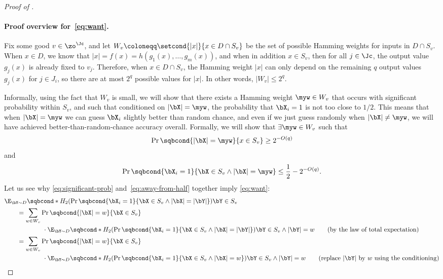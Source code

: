 \begin{proof}[Proof of ]
\paragraph*{Proof overview for~\eqref{eq:want}.} 
Fix some good $v \in \zo^\Jc$, and let $W_v \coloneqq \setcond{|x|}{x \in D \cap S_v}$ be the set of possible Hamming weights for inputs in $D \cap S_v$.
When $x \in D$, we know that $|x| = f(x) = h(g_1(x), \ldots, g_m(x))$, and when in addition $x \in S_v$, then for all $j \in \Jc$, the output value $g_j(x)$ is already fixed to $v_j$.
Therefore, when $x \in D \cap S_v$, the Hamming weight $|x|$ can only depend on the remaining $q$ output values $g_j(x)$ for $j \in J_i$, so there are at most $2^{q}$ possible values for $|x|$.
In other words, $|W_v| \leq 2^{q}$.

Informally, using the fact that $W_v$ is small, we will show that there exists a Hamming weight $\myw \in W_v$ that occurs with significant probability within $S_v$, and such that conditioned on $|\bX|=\myw$, the probability that $\bX_i=1$ is not too close to $1/2$.
This means that when $|\bX|=\myw$ we can guess $\bX_i$ slightly better than random chance, and even if we just guess randomly when $|\bX| \neq \myw$, we will have achieved better-than-random-chance accuracy overall.
Formally, we will show that $\exists \myw \in W_v$ such that
\begin{equation}
\label{eq:significant-prob}
\Pr\sqbcond{|\bX|=\myw}{x \in S_v} \geq 2^{-O(q)}
\end{equation}
and
\begin{equation}
\label{eq:away-from-half}
\Pr\sqbcond{\bX_i=1}{\bX \in S_v \wedge |\bX|=\myw} \leq \frac{1}{2} - 2^{-O(q)}.
\end{equation}
Let us see why \eqref{eq:significant-prob} and~\eqref{eq:away-from-half} together imply \eqref{eq:want}:
\begin{align*}
&\E_{\bY \sim D}\sqbcond*{H_2(\Pr\sqbcond{\bX_i=1}{\bX \in S_v \wedge|\bX|=|\bY|})}{\bY \in S_v}\\
&\qquad=\sum_{w \in W_v}\Pr\sqbcond{|\bX|=w}{\bX \in S_v}\\
&\qquad\qquad\qquad\cdot \E_{\bY \sim D}\sqbcond*{H_2(\Pr\sqbcond{\bX_i=1}{\bX \in S_v \wedge|\bX|=|\bY|})}{\bY \in S_v \wedge |\bY| = w}\tag{by the law of total expectation}\\
&\qquad=\sum_{w \in W_v}\Pr\sqbcond{|\bX|=w}{\bX \in S_v}\\
&\qquad\qquad\qquad\cdot \E_{\bY \sim D}\sqbcond*{H_2(\Pr\sqbcond{\bX_i=1}{\bX \in S_v \wedge|\bX|=w})}{\bY \in S_v \wedge |\bY| = w}\tag{replace $|\bY|$ by $w$ using the conditioning}\\

\end{align*}
\end{proof}
